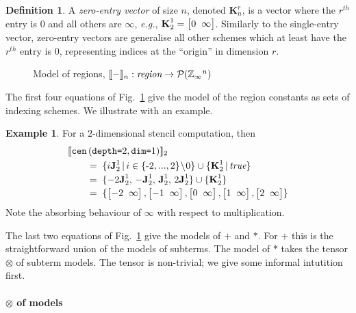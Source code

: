 \documentclass[9pt]{sigplanconf}
\newcounter{block}
\theoremstyle{definition}
\newtheorem{example}[block]{Example}
\newtheorem{definition}[block]{Definition}
\newcommand{\eg}{\emph{e.g.}}
\newcommand{\interp}[1]{\llbracket{#1}\rrbracket}
\newcommand{\term}[1]{\texttt{#1}}
\newcommand{\stenCenS}[2]{\term{cen} \, (\term{depth=}#1,
  \term{dim=}#2)}
\newcommand{\vtwoh}[2]{\setlength{\arraycolsep}{0em}
\left[\begin{array}{cc}#1 \; & \; #2\end{array}\right]}
\newcommand{\singleEntry}[2]{\textbf{J}_{#2}^{#1}}
\newcommand{\zeroEntry}[2]{\textbf{K}_{#2}^{#1}}
\begin{document}
\begin{definition}A \emph{zero-entry vector} of size $n$, denoted
$\zeroEntry{r}{n}$, is a vector where the $r^{th}$ entry is $0$ and all others
are $\infty$, \eg{}, $\zeroEntry{1}{2} = \vtwoh{0}{\infty}$.
Similarly to the single-entry vector, zero-entry vectors
are generalise all other schemes
which at least have the $r^{th}$ entry is $0$, representing indices at
the ``origin'' in dimension $r$.
\end{definition}

\begin{figure}[t]
\vspace{-0.9em}

\caption{Model of regions,
$\interp{-}_n : \textit{region} \rightarrow \mathcal{P}(\domainVal{}^n)$}
\label{fig:region-model}
\vspace{-0.7em}
\end{figure}

\noindent
The first four equations of Fig.~\ref{fig:region-model}
give the model of the region constants as sets of indexing
schemes. We illustrate with an example.

\begin{example}
For a $2$-dimensional stencil computation, then
\begin{align*}
& \interp{\stenCenS{2}{1}}_2 \\[-0.1em]
& \qquad = \; \{i\singleEntry{1}{2} \,|\, i \in \{\text{-}2,..., 2\}\!\setminus\!0 \}
  \cup  \{ \zeroEntry{1}{2} \,|\, \textit{true} \} \\[-0.2em]
& \qquad = \; \{-2\singleEntry{1}{2}, \, -\singleEntry{1}{2}, \,
  \singleEntry{1}{2}, \, 2\singleEntry{1}{2}\} \cup
  \{\zeroEntry{1}{2}\} \\[-0.2em]
& \qquad = \; \{\vtwoh{-2}{\infty}, \vtwoh{-1}{\infty}, \vtwoh{0}{\infty},
\vtwoh{1}{\infty}, \vtwoh{2}{\infty}\}
\end{align*}
Note the absorbing behaviour of $\infty$ with respect to
multiplication.
\end{example}
\noindent
The last two equations of Fig.~\ref{fig:region-model} give the
models of $\term{+}$ and $\term{*}$. For $\term{+}$ this is the 
straightforward union of the models of subterms. The model of
$\term{*}$ takes the tensor $\otimes$ of subterm models. The tensor is
non-trivial; we give some informal intutition first. 


\paragraph{$\otimes$ of models}
\end{document}
